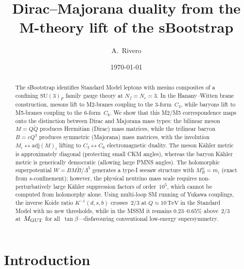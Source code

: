 \documentclass[aps,prd,twocolumn,showpacs,preprintnumbers,superscriptaddress,floatfix]{revtex4-2}
\newcommand{\SU}{\mathrm{SU}}
\newcommand{\Nf}{N_{\!f}}
\newcommand{\Nc}{N_{\!c}}
\newcommand{\adj}{\mathrm{adj}}
\newcommand{\TeV}{\,\mathrm{TeV}}
\begin{document}
\title{Dirac--Majorana duality from the M-theory lift
  of the sBootstrap}

\author{A.~Rivero}

\date{\today}

\begin{abstract}
The sBootstrap identifies Standard Model leptons with mesino
composites of a confining $\SU(3)_F$ family gauge theory at
$\Nf = \Nc = 3$.
In the Hanany--Witten brane construction, mesons lift to
M2-branes coupling to the 3-form~$C_3$, while baryons lift to
M5-branes coupling to the 6-form~$C_6$.
We show that this M2/M5 correspondence maps onto the distinction
between Dirac and Majorana mass types: the bilinear meson
$M = Q\tilde{Q}$ produces Hermitian (Dirac) mass matrices, while
the trilinear baryon $B = \varepsilon Q^3$ produces symmetric
(Majorana) mass matrices, with the involution
$M_i \leftrightarrow \adj(M)_i$ lifting to $C_3 \leftrightarrow C_6$
electromagnetic duality.
The meson K\"ahler metric is approximately diagonal (protecting
small CKM angles), whereas the baryon K\"ahler metric is
generically democratic (allowing large PMNS angles).
The holomorphic superpotential $W = BM\tilde{B}/\Lambda^5$
generates a type-I seesaw structure with
$M_R^{ii} = m_i$ (exact from $s$-confinement); however, the
physical neutrino mass scale requires non-perturbatively large
K\"ahler suppression factors of order~$10^5$, which cannot be
computed from holomorphy alone.
Using multi-loop SM running of Yukawa couplings, the inverse
Koide ratio $K^{-1}(d,s,b)$ crosses~$2/3$ at
$Q \approx 10\TeV$ in the Standard Model with no new thresholds,
while in the MSSM it remains $0.23$--$0.65\%$
above~$2/3$ at~$M_{\rm GUT}$ for all~$\tan\beta$---disfavouring
conventional low-energy supersymmetry.
\end{abstract}

\maketitle


\section{Introduction}
\label{sec:intro}
\end{document}
